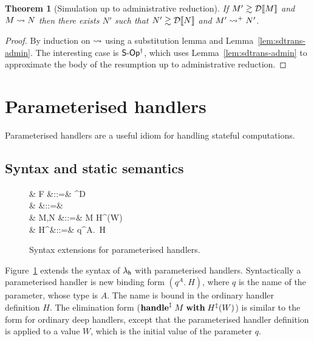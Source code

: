 \documentclass[12pt,phd,lfcs,twoside,openright,logo,leftchapter,normalheadings]{infthesis}
\theoremstyle{plain}
\newtheorem{theorem}{Theorem}[chapter]
\theoremstyle{definition}
\begin{document}
\begin{theorem}[Simulation up to administrative reduction]
If $M' \gtrsim \mathcal{D}\llbracket M \rrbracket$ and $M \leadsto N$ then there exists
$N'$ such that $N' \gtrsim \mathcal{D}\llbracket N \rrbracket$ and $M' \leadsto^+ N'$.
\end{theorem}
%
\begin{proof}
By induction on $\leadsto$ using a substitution lemma and
Lemma~\ref{lem:sdtrans-admin}. The interesting case is
$\mathsf{S\textrm{-}Op^\dagger}$, which uses Lemma~\ref{lem:sdtrans-admin} to
approximate the body of the resumption up to administrative reduction.
\end{proof}

\section{Parameterised handlers}
\label{sec:unary-parameterised-handlers}

Parameterised handlers are a useful idiom for handling stateful
computations.

\subsection{Syntax and static semantics}
%
\begin{figure}
  \begin{syntax}
    & F          &::=& \cdots \mid {} \Rightarrow^\param D\\
    & \delta     &::=& \cdots \mid \param\\
    & M,N        &::=& \cdots \mid \ParamHandle\; M \;\With\; H^\param(W)\\
    & H^\param   &::=& q^A.~H
  \end{syntax}
  \caption{Syntax extensions for parameterised handlers.}\label{fig:param-syntax}
\end{figure}
%
Figure~\ref{fig:param-syntax} extends the syntax of
$\lambda_{\mathsf{h}}$ with parameterised handlers. Syntactically a parameterised
handler is new binding form $(q^A.~H)$, where $q$ is the name of the
parameter, whose type is $A$. The name is bound in the ordinary
handler definition $H$. The elimination form
($\mathbf{handle}^{\ddagger}\; M\;\mathbf{with}\;H^{\ddagger}(W)$) is similar to the form for
ordinary deep handlers, except that the parameterised handler
definition is applied to a value $W$, which is the initial value of
the parameter $q$.
\end{document}
